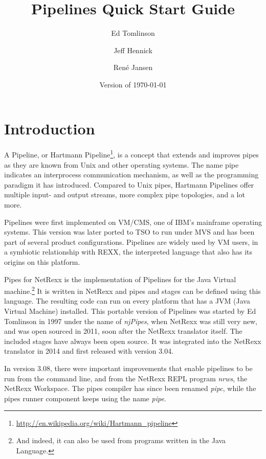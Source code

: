 

\renewcommand{\isbn}{978-90-819090-3-7}    
\setcounter{tocdepth}{1} 
\title{Pipelines Quick Start Guide}
\author{Ed Tomlinson \and Jeff Hennick \and René Jansen}
\date{Version  of \today}
\maketitle
{}
\pagestyle{plain}
\frontmatter
{}
\pagestyle{plain}

\tableofcontents
\newpage
{}
\frontmatter
\large


\mainmatter
\chapter{Introduction}
A Pipeline, or Hartmann Pipeline\footnote{\url{http://en.wikipedia.org/wiki/Hartmann_pipeline}}, is a concept that extends and improves pipes as they are known from Unix and other operating systems. The name pipe indicates an interprocess communication mechanism, as well as the programming paradigm it has introduced. Compared to Unix pipes, Hartmann Pipelines offer multiple input- and output streams, more complex pipe topologies, and a lot more.

Pipelines were first implemented on VM/CMS, one of IBM's mainframe
operating systems. This version was later ported to TSO to run under
MVS and has been part of several product configurations. Pipelines are
widely used by VM users, in a symbiotic relationship with REXX, the
interpreted language that also has its origins on this platform.

Pipes for NetRexx is the implementation of Pipelines for the Java Virtual
machine.\footnote{And indeed, it can also be used from programs written
  in the Java Language.} It is written in NetRexx and pipes and stages can be defined using this
language. The resulting code can run on every platform that has a JVM
(Java Virtual Machine) installed. This portable version of Pipelines was started
by Ed Tomlinson in 1997 under the name of \emph{njPipes}, when NetRexx was
still very new, and was open sourced in 2011, soon after the NetRexx
translator itself. The included stages have always been open source. It was integrated into the NetRexx translator in
2014 and first released with version 3.04.

In version 3.08, there were
important improvements that enable pipelines to be run from the
command line, and from the NetRexx REPL program \emph{nrws}, the
NetRexx Workspace. The pipes compiler has since been renamed
\emph{pipc}, while the pipes runner component keeps using the name \emph{pipe}.

